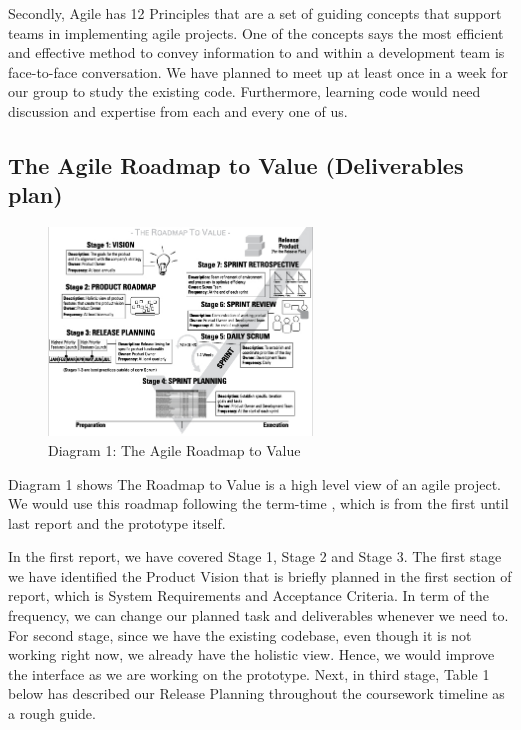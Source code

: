 			Secondly, Agile has 12 Principles \cite{agileProjectManagementForDummies} that are a set of guiding concepts that support teams in implementing agile projects. One of the concepts says the most efficient and effective method to convey information to and within a development team is face-to-face conversation. We have planned to meet up at least once in a week for our group to study the existing code. Furthermore, learning code would need discussion and expertise from each and every one of us.
			
	\newpage
	
	\subsection*{The Agile Roadmap to Value (Deliverables plan)}
		\begin{figure}[htbp]
			\centerline{\includegraphics[width=7cm]{resources/roadmaptovalue.jpg}}
				\caption{Diagram 1: The Agile Roadmap to Value \cite{agileRoadmapToValue}}
		\end{figure}
		
		Diagram 1 shows The Roadmap to Value is a high level view of an agile project. We would use this roadmap following the term-time , which is from the first until last report and the prototype itself.
		
		In the first report, we have covered Stage 1, Stage 2 and Stage 3. The first stage we have identified the Product Vision that is briefly planned in the first section of report, which is System Requirements and Acceptance Criteria. In term of the frequency, we can change our planned task and deliverables whenever we need to. For second stage, since we have the existing codebase, even though it is not working right now, we already have the holistic view. Hence, we would improve the interface as we are working on the prototype. Next, in third stage, Table 1 below has described our Release Planning throughout the coursework timeline as a rough guide. 
		
